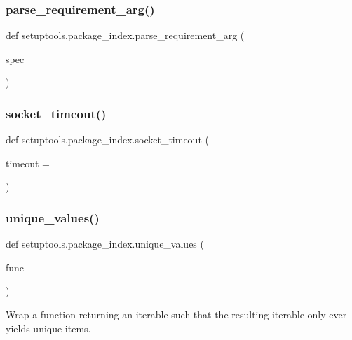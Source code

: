 \subsubsection{\texorpdfstring{parse\+\_\+requirement\+\_\+arg()}{parse\_requirement\_arg()}}
{\footnotesize\ttfamily def setuptools.\+package\+\_\+index.\+parse\+\_\+requirement\+\_\+arg (\begin{DoxyParamCaption}\item[{}]{spec }\end{DoxyParamCaption})}

\mbox{\label{namespacesetuptools_1_1package__index_a3d3d4071a980831697f5e1495af7af16}} 
\subsubsection{\texorpdfstring{socket\+\_\+timeout()}{socket\_timeout()}}
{\footnotesize\ttfamily def setuptools.\+package\+\_\+index.\+socket\+\_\+timeout (\begin{DoxyParamCaption}\item[{}]{timeout = {} }\end{DoxyParamCaption})}

\mbox{\label{namespacesetuptools_1_1package__index_af5a53fb83bee4d01a3dd7e1668bccda6}} 
\subsubsection{\texorpdfstring{unique\+\_\+values()}{unique\_values()}}
{\footnotesize\ttfamily def setuptools.\+package\+\_\+index.\+unique\+\_\+values (\begin{DoxyParamCaption}\item[{}]{func }\end{DoxyParamCaption})}

\begin{DoxyVerb}Wrap a function returning an iterable such that the resulting iterable
only ever yields unique items.
\end{DoxyVerb}
 

